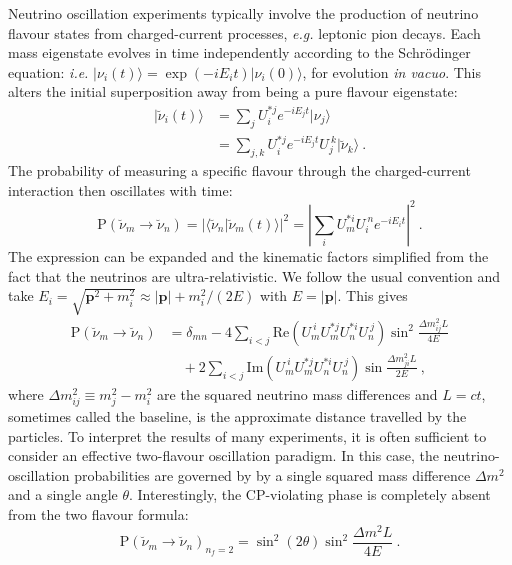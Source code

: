 Neutrino oscillation experiments typically involve the production of neutrino
flavour states from charged-current processes, \textit{e.g.} leptonic pion
decays. Each mass eigenstate evolves in time independently according to the
Schr\"{o}dinger equation: \textit{i.e.}
$| \nu_{i} (t) \rangle = \exp{(-i E_{i} t)} | \nu_{i} (0) \rangle$, for evolution
\textit{in vacuo}. This alters the initial superposition away from being a pure
flavour eigenstate:
\begin{align}
  | \breve{\nu}_{i} (t) \rangle &= \sum_{j} U_{i}^{* j} e^{-i E_{j} t} | \nu_{j} \rangle \\
                                &= \sum_{j,k} U_{i}^{* j} e^{-i E_{j} t} U_{j}^{\ k} | \breve{\nu}_{k} \rangle \ .
\end{align}
The probability of measuring a specific flavour through the charged-current
interaction then oscillates with time:
\begin{equation}
  \text{P}(\breve{\nu}_{m} \to \breve{\nu}_{n}) = | \langle \breve{\nu}_{n} | \breve{\nu}_{m} (t) \rangle |^{2} = \left| \sum_{i} U_{m}^{* i} U_{i}^{\ n} e^{-i E_{i} t} \right|^{2} \ .
\end{equation}
The expression can be expanded and the kinematic factors simplified from the
fact that the neutrinos are ultra-relativistic. We follow the usual convention
and take
$E_{i} = \sqrt{\mathbf{p}^{2} + m_{i}^{2}} \approx |\mathbf{p}| + m_{i}^{2} / (2 E)$
with $E = |\mathbf{p}|$. This gives
\begin{equation}
  \label{eq:ch1-neutrino-osc}
  \begin{aligned}
    \text{P}(\breve{\nu}_{m} \to \breve{\nu}_{n}) &= \delta_{mn} - 4 \sum_{i < j} \mathrm{Re}\left( U_{m}^{\ i} U_{m}^{* j} U_{n}^{* i} U_{n}^{\ j}  \right) \sin^{2} \frac{\Delta m_{ij}^{2} L}{4E}\\
    &\quad + 2 \sum_{i<j} \mathrm{Im}\left( U_{m}^{\ i} U_{m}^{* j} U_{n}^{* i} U_{n}^{\ j}  \right) \sin \frac{\Delta m^{2}_{ji} L}{2E} \ ,
  \end{aligned}
\end{equation}
where $\Delta m_{ij}^{2} \equiv m_{j}^{2} - m_{i}^{2}$ are the squared neutrino
mass differences and $L = ct$, sometimes called the baseline, is the approximate
distance travelled by the particles. To interpret the results of many
experiments, it is often sufficient to consider an effective two-flavour
oscillation paradigm. In this case, the neutrino-oscillation probabilities are
governed by by a single squared mass difference $\Delta m^{2}$ and a single
angle $\theta$. Interestingly, the CP-violating phase is completely absent from
the two flavour formula:
\begin{equation}
  \label{eq:ch1-two-flavour-osc}
  \text{P}(\breve{\nu}_{m} \to \breve{\nu}_{n})_{n_{f}=2} = \sin^{2} (2\theta) \sin^{2} \frac{\Delta m^{2} L}{4E} \ .
\end{equation}

